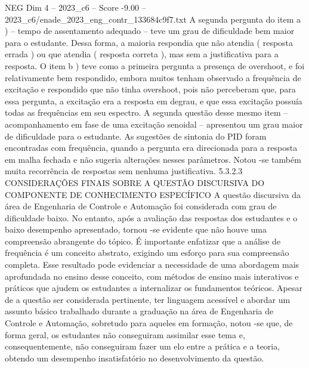 \begin{textsample}{NEG Dim 4 – 2023\_c6 – Score -9.00 – 2023\_c6/enade\_2023\_eng\_contr\_133684c9f7.txt}
A segunda pergunta do item a ) – tempo de assentamento adequado – teve um grau de dificuldade bem maior para o estudante.
Dessa forma, a maioria respondia que não atendia ( resposta errada ) ou que atendia ( resposta correta ), mas sem a justificativa para a resposta.
O item b ) teve como a primeira pergunta a presença de overshoot, e foi relativamente bem respondido, embora muitos tenham observado a frequência de excitação e respondido que não tinha overshoot, pois não perceberam que, para essa pergunta, a excitação era a resposta em degrau, e que essa excitação possuía todas as frequências em seu espectro.
A segunda questão desse mesmo item – acompanhamento em fase de uma excitação senoidal – apresentou um grau maior de dificuldade para o estudante.
As sugestões de sintonia do PID foram encontradas com frequência, quando a pergunta era direcionada para a resposta em malha fechada e não sugeria alterações nesses parâmetros.
Notou -se também muita recorrência de respostas sem nenhuma justificativa. 5.3.2.3 CONSIDERAÇÕES FINAIS SOBRE A QUESTÃO DISCURSIVA DO COMPONENTE DE CONHECIMENTO ESPECÍFICO A questão discursiva da área de Engenharia de Controle e Automação foi considerada com grau de dificuldade baixo.
No entanto, após a avaliação das respostas dos estudantes e o baixo desempenho apresentado, tornou -se evidente que não houve uma compreensão abrangente do tópico.
É importante enfatizar que a análise de frequência é um conceito abstrato, exigindo um esforço para sua compreensão completa.
Esse resultado pode evidenciar a necessidade de uma abordagem mais aprofundada no ensino desse conceito, com métodos de ensino mais interativos e práticos que ajudem os estudantes a internalizar os fundamentos teóricos.
Apesar de a questão ser considerada pertinente, ter linguagem acessível e abordar um assunto básico trabalhado durante a graduação na área de Engenharia de Controle e Automação, sobretudo para aqueles em formação, notou -se que, de forma geral, os estudantes não conseguiram assimilar esse tema e, consequentemente, não conseguiram fazer um elo entre a prática e a teoria, obtendo um desempenho insatisfatório no desenvolvimento da questão.

\end{textsample}
